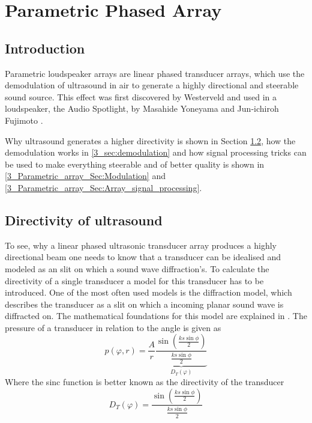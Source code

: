 \chapter{Parametric Phased Array}
\newpage
\section{Introduction}
Parametric loudspeaker arrays are linear phased transducer arrays, which use the demodulation of ultrasound in air to generate a highly directional and steerable sound source. This effect was first discovered by Westerveld \cite{doi:10.1121/1.1918525} and used in a loudspeaker, the Audio Spotlight, by Masahide Yoneyama and Jun‐ichiroh Fujimoto \cite{doi:10.1121/1.389414}.

Why ultrasound generates a higher directivity is shown in Section \ref{3_sec:directivity}, how the demodulation works in \ref{3_sec:demodulation} and how signal processing tricks can be used to make everything steerable and of better quality is shown in \ref{3_Parametric_array_Sec:Modulation} and \ref{3_Parametric_array_Sec:Array_signal_processing}.
\section{Directivity of ultrasound}\label{3_sec:directivity}
To see, why a linear phased ultrasonic transducer array produces a highly directional beam one needs to know that a transducer can be idealised and modeled as an slit on which a sound wave diffraction's.
To calculate the directivity of a single transducer a model for this transducer has to be introduced. One of the most often used models is the diffraction model, which describes the transducer as a slit on which a incoming planar sound wave is diffracted on. The mathematical foundations for this model are explained in . 
The pressure of a transducer in relation to the angle is given as
\begin{equation}
    p(\varphi,r) 
    = 
    \frac{A}{r} \underbrace{\frac{\sin \left ( \frac{ks \sin \phi}{2}\right )}{ \frac{ks \sin \phi}{2}}}_{D_T(\varphi)}
\end{equation}
Where the sinc function is better known as the directivity of the transducer
\begin{equation}
    D_T(\varphi) = \frac{\sin \left ( \frac{ks \sin \phi}{2}\right )}{ \frac{ks \sin \phi}{2}}
\end{equation}
